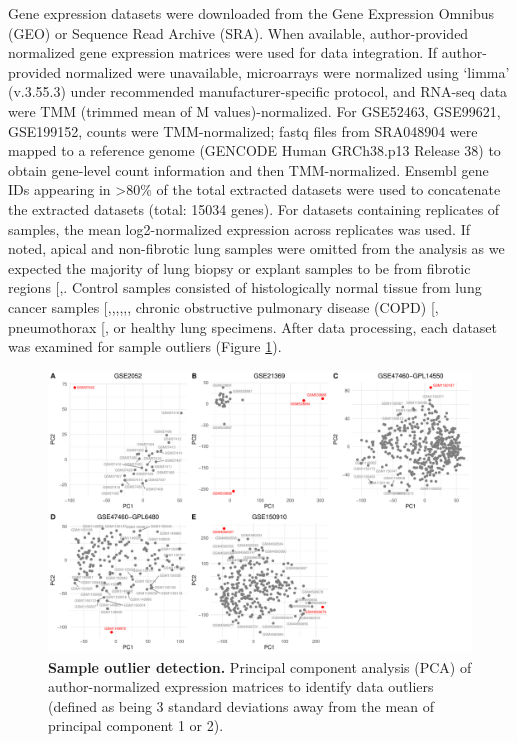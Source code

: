 \documentclass[
]{article}
\begin{document}
Gene expression datasets were downloaded from the Gene Expression Omnibus (GEO) or Sequence Read Archive (SRA). When available, author-provided normalized gene expression matrices were used for data integration. If author-provided normalized were unavailable, microarrays were normalized using `limma' (v.3.55.3) under recommended manufacturer-specific protocol, and RNA-seq data were TMM (trimmed mean of M values)-normalized. For GSE52463, GSE99621, GSE199152, counts were TMM-normalized; fastq files from SRA048904 were mapped to a reference genome (GENCODE Human GRCh38.p13 Release 38) to obtain gene-level count information and then TMM-normalized. Ensembl gene IDs appearing in \textgreater80\% of the total extracted datasets were used to concatenate the extracted datasets (total: 15034 genes). For datasets containing replicates of samples, the mean log2-normalized expression across replicates was used. If noted, apical and non-fibrotic lung samples were omitted from the analysis as we expected the majority of lung biopsy or explant samples to be from fibrotic regions {[},\citeproc{ref-luzina_transcriptomic_2018}{84}{]}. Control samples consisted of histologically normal tissue from lung cancer samples {[},,,,,\citeproc{ref-christmann_mir-155_2016}{81}{]}, chronic obstructive pulmonary disease (COPD) {[}\citeproc{ref-deng_detecting_2013}{64}{]}, pneumothorax {[}\citeproc{ref-geng_down-regulation_2015}{80}{]}, or healthy lung specimens. After data processing, each dataset was examined for sample outliers (Figure \ref{fig:outlierPCA}).



\begin{figure}

{\centering \includegraphics[width=0.9\linewidth,]{./Figures/SysReview/FigE1_outliers} 

}

\caption[Outlier detection]{\textbf{Sample outlier detection.} Principal component analysis (PCA) of author-normalized expression matrices to identify data outliers (defined as being 3 standard deviations away from the mean of principal component 1 or 2).}\label{fig:outlierPCA}
\end{figure}
\end{document}

